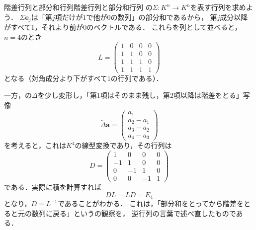 \begin{example}{階差行列と部分和行列}{階差行列と部分和行列}
  の$\Sigma \colon K^n \to K^n$を表す行列を求めよう．
  $\Sigma \bm{e}_j$は「第$j$項だけが$1$で他が$0$の数列」の部分和であるから，
  第$j$成分以降がすべて$1$，それより前が$0$のベクトルである．
  これらを列として並べると，$n = 4$のとき
  \[
    L =
    \begin{pmatrix}
      1 & 0 & 0 & 0 \\
      1 & 1 & 0 & 0 \\
      1 & 1 & 1 & 0 \\
      1 & 1 & 1 & 1
    \end{pmatrix}
  \]
  となる（対角成分より下がすべて$1$の行列である）．

  一方，の$\Delta$を少し変形し，「第$1$項はそのまま残し，第$2$項以降は階差をとる」写像
  \[
    \widetilde{\Delta} \bm{a} =
    \begin{pmatrix} a_1 \\ a_2 - a_1 \\ a_3 - a_2 \\ a_4 - a_3 \end{pmatrix}
  \]
  を考えると，これは$K^4$の線型変換であり，その行列は
  \[
    D =
    \begin{pmatrix}
      1 & 0 & 0 & 0 \\
      -1 & 1 & 0 & 0 \\
      0 & -1 & 1 & 0 \\
      0 & 0 & -1 & 1
    \end{pmatrix}
  \]
  である．実際に積を計算すれば
  \[
    DL = LD = E_4
  \]
  となり，$D = L^{-1}$であることがわかる．
  これは，「部分和をとってから階差をとると元の数列に戻る」というの観察を，
  逆行列の言葉で述べ直したものである．
\end{example}

